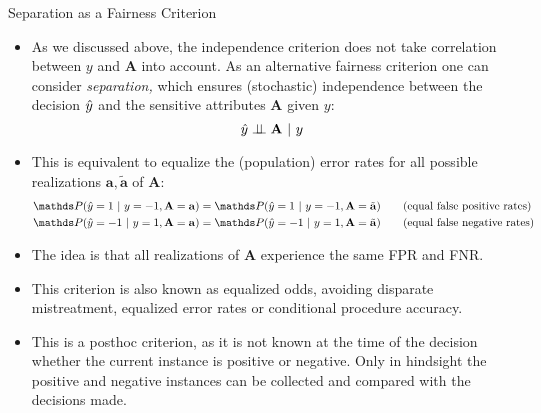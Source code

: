 \documentclass[11pt,compress,t,notes=noshow, xcolor=table]{beamer}
\newcommand{\sens}{\mathbf{A}} %
\newcommand{\ba}{\mathbf{a}}
\newcommand{\batilde}{\tilde{\mathbf{a}}}
\newcommand{\indep}{\perp \!\!\! \perp} %
\begin{document}
\begin{vbframe}{Separation as a Fairness Criterion}
	\footnotesize{
		\begin{itemize}
			\item As we discussed above, the independence criterion does not take correlation between $y$ and $\sens$ into account. As an alternative fairness criterion one can consider \emph{separation,} which ensures (stochastic) independence between the decision $\hat{y}$ and the sensitive attributes $\sens$ given $y:$
			$$	\yh \indep \sens ~|~y	$$
			\item This is equivalent to equalize the (population) error rates for all possible realizations $\ba,\batilde$ of $\sens:$
			\begin{align*}
				 &\P(  \yh = 1 ~|~ y = -1, \sens = \ba ) = \P(  \yh = 1 ~|~ y=-1, \sens = \batilde ) \tag{equal false positive rates}\\
				 &\P(  \yh = -1 ~|~ y = 1, \sens = \ba ) = \P(  \yh = -1 ~|~ y=1, \sens = \batilde ) \tag{equal false negative rates}
			\end{align*}
			\item The idea is that all realizations of $\sens$ experience the same FPR and FNR.
%				
			\item This criterion is also known as equalized odds, avoiding disparate mistreatment, equalized error rates or conditional procedure accuracy.
%			
			\item This is a posthoc criterion, as it is not known at the time of the decision whether the current instance is positive or negative. Only in hindsight the positive and negative instances can be collected and compared with the decisions made. 
		\end{itemize}
	}
\end{vbframe}
\end{document}
